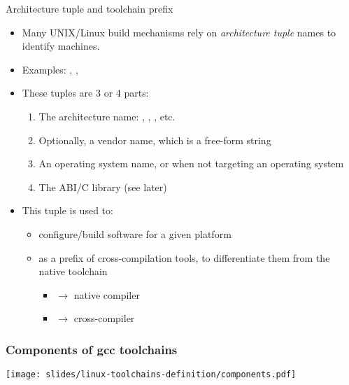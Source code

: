\begin{frame}{Architecture tuple and toolchain prefix}
  \begin{itemize}
  \item Many UNIX/Linux build mechanisms rely on {\em architecture tuple}
        names to identify machines.
  \item Examples: , , 
  \item These tuples are 3 or 4 parts:
    \begin{enumerate}
    \item The architecture name: , , , etc.
    \item Optionally, a vendor name, which is a free-form string
    \item An operating system name, or  when not targeting an operating system
    \item The ABI/C library (see later)
    \end{enumerate}
  \item This tuple is used to:
    \begin{itemize}
    \item configure/build software for a given platform
    \item as a prefix of cross-compilation tools, to differentiate
          them from the native toolchain
      \begin{itemize}
      \item {} $\rightarrow$ native compiler
      \item {} $\rightarrow$ cross-compiler
      \end{itemize}
    \end{itemize}
  \end{itemize}
\end{frame}

\begin{frame}
  \frametitle{Components of gcc toolchains}
  \begin{center}
    \texttt{[image: slides/linux-toolchains-definition/components.pdf]}
  \end{center}
\end{frame}

